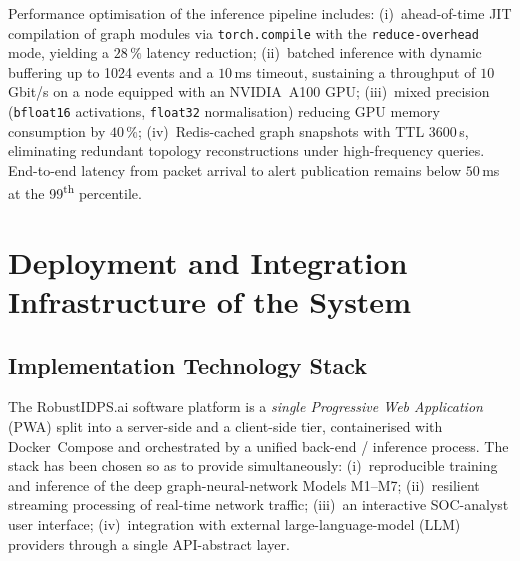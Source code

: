Performance optimisation of the inference pipeline includes: (i)~ahead-of-time JIT compilation of graph modules via \texttt{torch.compile} with the \texttt{reduce-overhead} mode, yielding a $28\,\%$ latency reduction; (ii)~batched inference with dynamic buffering up to 1024 events and a $10\,$ms timeout, sustaining a throughput of $10\,$Gbit/s on a node equipped with an NVIDIA~A100 GPU; (iii)~mixed precision (\texttt{bfloat16} activations, \texttt{float32} normalisation) reducing GPU memory consumption by $40\,\%$; (iv)~Redis-cached graph snapshots with TTL $3600\,$s, eliminating redundant topology reconstructions under high-frequency queries. End-to-end latency from packet arrival to alert publication remains below $50\,$ms at the 99\textsuperscript{th} percentile.

\section{Deployment and Integration Infrastructure of the System}
\label{sec:tech_stack_ui}

\subsection{Implementation Technology Stack}
\label{subsec:tech_stack}

The RobustIDPS.ai software platform is a \emph{single Progressive
Web Application} (PWA) split into a server-side and a client-side
tier, containerised with Docker~Compose and orchestrated by a unified
back-end / inference process. The stack has been chosen so as to
provide simultaneously: (i)~reproducible training and inference of
the deep graph-neural-network Models M1--M7; (ii)~resilient
streaming processing of real-time network traffic; (iii)~an
interactive SOC-analyst user interface; (iv)~integration with
external large-language-model (LLM) providers through a single
API-abstract layer.

